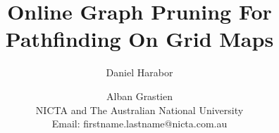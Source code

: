 \documentclass{article}
\begin{document}
\title{Online Graph Pruning For Pathfinding On Grid Maps}
\author{
Daniel Harabor 
\and 
Alban Grastien \\
NICTA and The Australian National University \\
Email: firstname.lastname@nicta.com.au
}

\maketitle

\begin{abstract}

\end{abstract}











\end{document}
